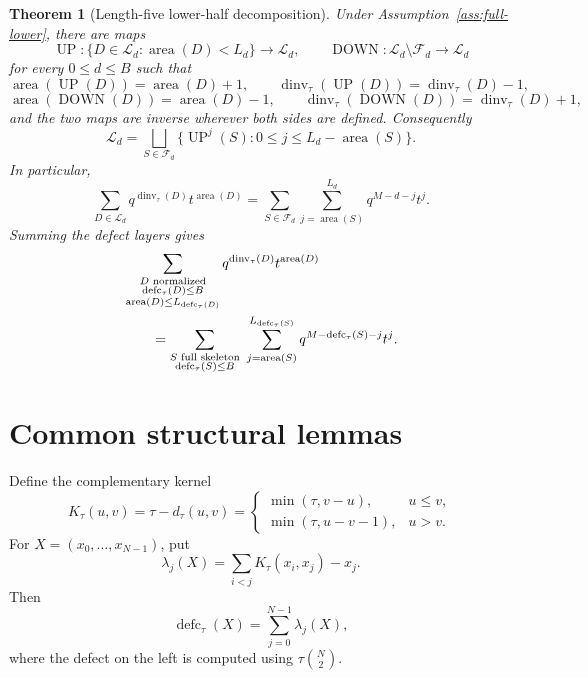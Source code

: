 \documentclass[11pt]{article}
\newtheorem{theorem}{Theorem}[section]
\theoremstyle{definition}
\theoremstyle{remark}
\newcommand{\area}{\operatorname{area}}
\newcommand{\dinv}{\operatorname{dinv}}
\newcommand{\defc}{\operatorname{defc}}
\newcommand{\UP}{\operatorname{UP}}
\newcommand{\DOWN}{\operatorname{DOWN}}
\begin{document}
\begin{theorem}[Length-five lower-half decomposition]
\label{thm:main}
Under Assumption~\ref{ass:full-lower}, there are maps
\[
 \UP:\{D\in\mathcal L_d:\area(D)<L_d\}\longrightarrow\mathcal L_d,
 \qquad
 \DOWN:\mathcal L_d\setminus\mathcal F_d\longrightarrow\mathcal L_d
\]
for every $0\le d\le B$ such that
\[
 \area(\UP(D))=\area(D)+1,
 \qquad
 \dinv_\tau(\UP(D))=\dinv_\tau(D)-1,
\]
\[
 \area(\DOWN(D))=\area(D)-1,
 \qquad
 \dinv_\tau(\DOWN(D))=\dinv_\tau(D)+1,
\]
and the two maps are inverse wherever both sides are defined.  Consequently
\begin{equation}
 \mathcal L_d
 =\bigsqcup_{S\in\mathcal F_d}
   \{\UP^j(S):0\le j\le L_d-\area(S)\}.
 \label{eq:lower-union}
\end{equation}
In particular,
\begin{equation}
 \sum_{D\in\mathcal L_d}q^{\dinv_\tau(D)}t^{\area(D)}
 =\sum_{S\in\mathcal F_d}
   \sum_{j=\area(S)}^{L_d}q^{M-d-j}t^j.
 \label{eq:lower-gf}
\end{equation}
Summing the defect layers gives
\begin{align}
 &\sum_{\substack{D\text{ normalized}\\
                   \defc_\tau(D)\le B\\
                   \area(D)\le L_{\defc_\tau(D)}}}
   q^{\dinv_\tau(D)}t^{\area(D)}\notag\\
 &\qquad=
 \sum_{\substack{S\text{ full skeleton}\\\defc_\tau(S)\le B}}
 \ \sum_{j=\area(S)}^{L_{\defc_\tau(S)}}
 q^{M-\defc_\tau(S)-j}t^j.
 \label{eq:aggregate-lower-gf}
\end{align}
\end{theorem}
\section{Common structural lemmas}

Define the complementary kernel
\[
 K_\tau(u,v)=\tau-d_\tau(u,v)
 =
 \begin{cases}
   \min(\tau,v-u),&u\le v,\\
   \min(\tau,u-v-1),&u>v.
 \end{cases}
\]
For $X=(x_0,\ldots,x_{N-1})$, put
\[
  \lambda_j(X)=\sum_{i<j}K_\tau(x_i,x_j)-x_j.
\]
Then
\begin{equation}
  \defc_\tau(X)=\sum_{j=0}^{N-1}\lambda_j(X),
  \label{eq:defect-lambda}
\end{equation}
where the defect on the left is computed using
$\tau\binom N2$.
\end{document}
